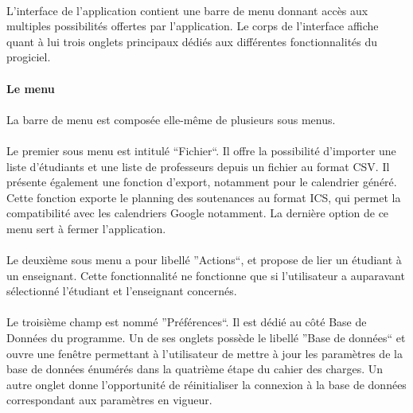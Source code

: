 \documentclass[a4paper,10pt]{report}
\begin{document}
	\paragraph{}
	  L'interface de l'application contient une barre de menu donnant accès aux multiples possibilités offertes par l'application.
	  Le corps de l'interface affiche quant à lui trois onglets principaux dédiés aux différentes fonctionnalités du progiciel. 
	  
	\paragraph{Le menu}
	  \paragraph{}
	    La barre de menu est composée elle-même de plusieurs sous menus.
	  \paragraph{}
	    Le premier sous menu est intitulé ``Fichier``. Il offre la possibilité d'importer une liste d'étudiants et une liste de professeurs depuis un fichier au format CSV.
	    Il présente également une fonction d'export, notamment pour le calendrier généré. Cette fonction exporte le planning des soutenances au format ICS, qui permet la compatibilité avec les calendriers Google notamment.
	    La dernière option de ce menu sert à fermer l'application.
	  \paragraph{}
	    Le deuxième sous menu a pour libellé ''Actions``, et propose de lier un étudiant à un enseignant. 
	    Cette fonctionnalité ne fonctionne que si l'utilisateur a auparavant sélectionné l'étudiant et l'enseignant concernés.
	  \paragraph{}
	    Le troisième champ est nommé ''Préférences``.
	    Il est dédié au côté Base de Données du programme.
	    Un de ses onglets possède le libellé ''Base de données`` et ouvre une fenêtre permettant à l'utilisateur de mettre à jour les paramètres de la base de données énumérés dans la quatrième étape du cahier des charges. 
	    Un autre onglet donne l'opportunité de réinitialiser la connexion à la base de données correspondant aux paramètres en vigueur.
\end{document}
